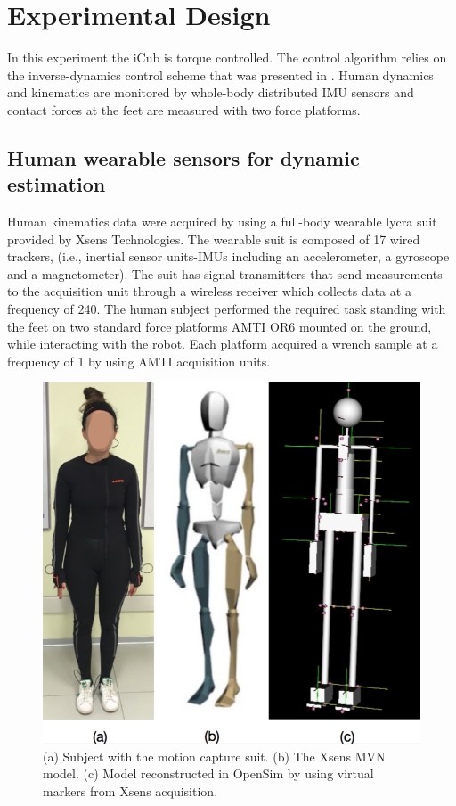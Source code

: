 
\section{Experimental Design}
%
In this experiment the iCub is torque controlled. The control algorithm relies on the inverse-dynamics 
control scheme that was presented in \cite{NoriTrav2015}. Human dynamics and kinematics are monitored by 
whole-body distributed IMU sensors and contact forces at the feet are measured with two force platforms.
%
\subsection{Human wearable sensors for dynamic estimation}
 Human kinematics data were acquired by using a full-body wearable lycra suit provided by Xsens Technologies.  
The wearable suit is composed of 17 wired trackers, (i.e., inertial sensor units-IMUs including an
 accelerometer, a gyroscope and a magnetometer). The suit has signal transmitters that send
  measurements to the acquisition unit through a wireless receiver which collects data at a
   frequency of \unit{240}{\hertz}. The human subject performed the required
    task standing with the
   feet on two standard force platforms AMTI OR6 mounted on the ground, while interacting 
   with the robot.
	  Each platform acquired a wrench sample at a frequency of
	   \unit{1}{\kilo\hertz} by using AMTI acquisition units. 
%
\begin{figure}
  \centering
    \includegraphics[width=0.9\columnwidth]{figs/humanModels}
  \caption{(a) Subject with the motion capture suit. (b) The Xsens MVN model. (c) Model reconstructed in OpenSim by using virtual markers from Xsens acquisition.}
 \label{fig:human_models}
\end{figure}
%
